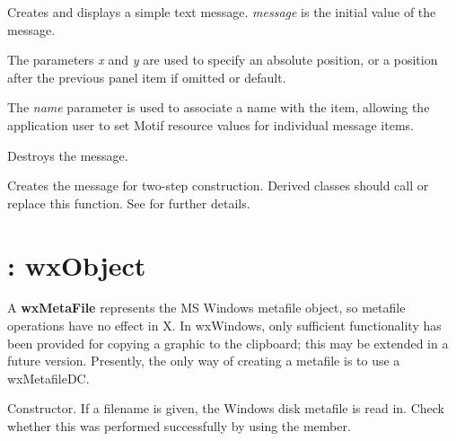 Creates and displays a simple text message. {\it message} is the initial
value of the message.

The parameters {\it x} and {\it y} are used to specify an absolute
position, or a position after the previous panel item if omitted or
default.

The {\it name} parameter is used to associate a name with the item,
allowing the application user to set Motif resource values for
individual message items.



Destroys the message.




Creates the message for two-step construction. Derived classes
should call or replace this function. See 
for further details.

\section{: wxObject}\label{wxmetafile}

A {\bf wxMetaFile} represents the MS Windows metafile object, so metafile
operations have no effect in X. In wxWindows, only sufficient functionality
has been provided for copying a graphic to the clipboard; this may be extended
in a future version. Presently, the only way of creating a metafile
is to use a wxMetafileDC.



Constructor. If a filename is given, the Windows disk metafile is
read in. Check whether this was performed successfully by
using the  member.

